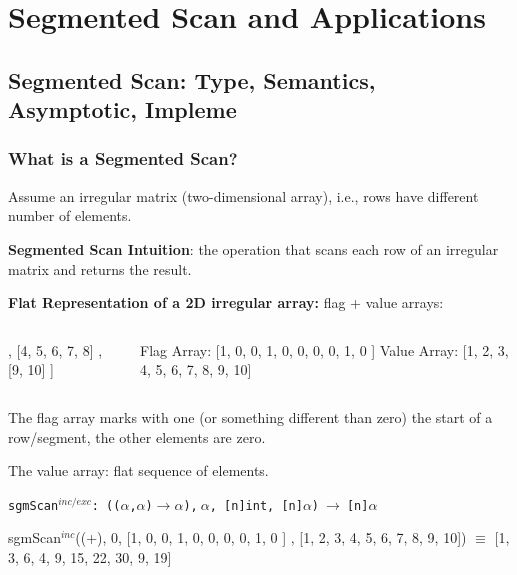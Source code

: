 \documentclass{beamer}
\renewcommand{\emph}[1]{\textcolor{CosGreen}{ #1}}
\newcommand{\emp}[1]{\textcolor{DikuRed}{ #1}}
\newcommand{\mymath}[1]{$ #1 $}
\newcommand{\myindu}[1]{^{#1}}
\begin{document}
\section{Segmented Scan and Applications}

\subsection{Segmented Scan: Type, Semantics, Asymptotic, Impleme}

\begin{frame}[fragile,t]
  \frametitle{What is a Segmented Scan?}

\pause
Assume an \emp{irregular} matrix (two-dimensional array), 
i.e., rows have different number of elements.\medskip

{\bf Segmented Scan Intuition}: the operation that scans each
row of an irregular matrix and returns the result.\medskip

{\bf Flat Representation of a 2D irregular array:} flag + value arrays:
\pause
\begin{columns}
\begin{colorcode}
[ [1, 2, 3]
, [4, 5, 6, 7, 8]
, [9, 10]
]
\end{colorcode}
\begin{colorcode}
Flag Array:
[1, 0, 0, 1, 0, 0, 0, 0, 1, 0 ]
Value Array:
[1, 2, 3, 4, 5, 6, 7, 8, 9, 10]
\end{colorcode}
\end{columns}\medskip

\emp{The flag array} marks with one (or something different than zero) 
the start of a row/segment, the other elements are zero.\medskip

\emp{The value array}: flat sequence of elements. \bigskip

\begin{scriptsize}
\emp{{\tt sgmScan$^{inc/exc}$:~(($\alpha$,$\alpha$)$\rightarrow\alpha$),$~\alpha$,~[n]int,~[n]$\alpha$)$~\rightarrow~$[n]$\alpha$}}\\
\begin{colorcode}
\emp{sgmScan\mymath{\myindu{inc}}((+), 0, [1, 0, 0, 1, 0, 0,  0,  0,  1, 0 ]}
               \emp{ , [1, 2, 3, 4, 5, 6,  7,  8,  9, 10])} \mymath{\equiv}\pause
               \emph{   [1, 3, 6, 4, 9, 15, 22, 30, 9, 19]}
\end{colorcode}
\end{scriptsize}
\end{frame}
\end{document}
